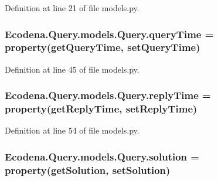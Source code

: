 Definition at line 21 of file models.py.

\hypertarget{class_ecodena_1_1_query_1_1models_1_1_query_a922030477827a717dbe6277292084874}{
\subsubsection[{queryTime}]{\setlength{\rightskip}{0pt plus 5cm}Ecodena.Query.models.Query.queryTime = property(getQueryTime, setQueryTime)}}
\label{de/d81/class_ecodena_1_1_query_1_1models_1_1_query_a922030477827a717dbe6277292084874}


Definition at line 45 of file models.py.

\hypertarget{class_ecodena_1_1_query_1_1models_1_1_query_a120b8bc5cef02ce8727153a0126cec3c}{
\subsubsection[{replyTime}]{\setlength{\rightskip}{0pt plus 5cm}Ecodena.Query.models.Query.replyTime = property(getReplyTime, setReplyTime)}}
\label{de/d81/class_ecodena_1_1_query_1_1models_1_1_query_a120b8bc5cef02ce8727153a0126cec3c}


Definition at line 54 of file models.py.

\hypertarget{class_ecodena_1_1_query_1_1models_1_1_query_a44c24c91765bafb665f0a4ff25819694}{
\subsubsection[{solution}]{\setlength{\rightskip}{0pt plus 5cm}Ecodena.Query.models.Query.solution = property(getSolution, setSolution)}}
\label{de/d81/class_ecodena_1_1_query_1_1models_1_1_query_a44c24c91765bafb665f0a4ff25819694}



